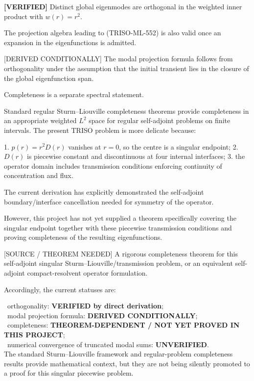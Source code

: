 \documentclass[11pt,a4paper]{article}
\begin{document}
\textbf{[VERIFIED]} Distinct global eigenmodes are orthogonal in the weighted inner product with $w(r)=r^2$.

The projection algebra leading to (TRISO-ML-552) is also valid once an expansion in the eigenfunctions is admitted.

[DERIVED CONDITIONALLY] The modal projection formula follows from orthogonality under the assumption that the initial transient lies in the closure of the global eigenfunction span.

Completeness is a separate spectral statement.

Standard regular Sturm–Liouville completeness theorems provide completeness in an appropriate weighted $L^2$ space for regular self-adjoint problems on finite intervals. The present TRISO problem is more delicate because:

1. $p(r)=r^2D(r)$ vanishes at $r=0$, so the centre is a singular endpoint;
2. $D(r)$ is piecewise constant and discontinuous at four internal interfaces;
3. the operator domain includes transmission conditions enforcing continuity of concentration and flux.

The current derivation has explicitly demonstrated the self-adjoint boundary/interface cancellation needed for symmetry of the operator.

However, this project has not yet supplied a theorem specifically covering the singular endpoint together with these piecewise transmission conditions and proving completeness of the resulting eigenfunctions.

[SOURCE / THEOREM NEEDED] A rigorous completeness theorem for this self-adjoint singular Sturm–Liouville/transmission problem, or an equivalent self-adjoint compact-resolvent operator formulation.

Accordingly, the current statuses are:

\noindent\textbullet\ orthogonality: \textbf{VERIFIED by direct derivation};\\
\noindent\textbullet\ modal projection formula: \textbf{DERIVED CONDITIONALLY};\\
\noindent\textbullet\ completeness: \textbf{THEOREM-DEPENDENT / NOT YET PROVED IN THIS PROJECT};\\
\noindent\textbullet\ numerical convergence of truncated modal sums: \textbf{UNVERIFIED}.\\

The standard Sturm–Liouville framework and regular-problem completeness results provide mathematical context, but they are not being silently promoted to a proof for this singular piecewise problem.
\end{document}
